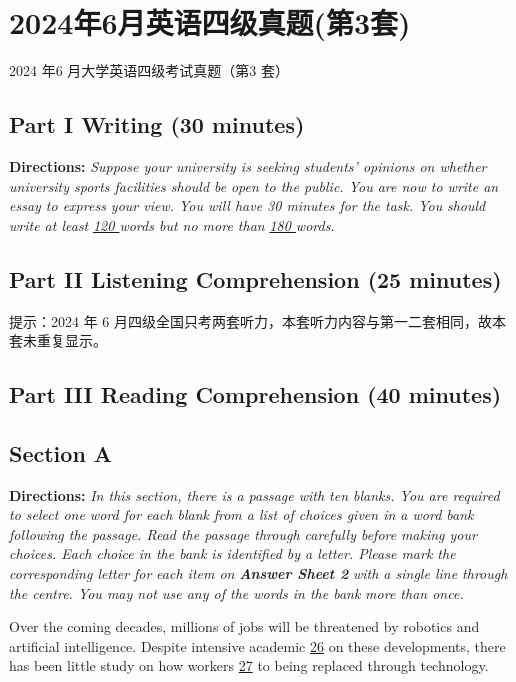 \documentclass[UTF8,11pt]{ctexart}
\begin{document}
\section*{2024年6月英语四级真题(第3套)}
2024 年6 月大学英语四级考试真题（第3 套）


\subsection*{\textbf{Part I Writing} \textbf{(30 minutes)}}


\textbf{Directions:} \textit{Suppose your university is seeking students’ opinions on whether university sports facilities should be} \textit{open to the public. You are now to write an essay to express your view. You will have 30 minutes for the task. You} \textit{should write at least }\textit{\uline{120 }}\textit{words but no more than }\textit{\uline{180 }}\textit{words.}


\subsection*{\textbf{Part II} \textbf{Listening Comprehension} \textbf{(25 minutes)}}


提示：2024 年 6 月四级全国只考两套听力，本套听力内容与第一二套相同，故本套未重复显示。


\subsection*{\textbf{Part III Reading Comprehension (40 minutes)}}


\subsection*{\textbf{Section A}}


\textbf{Directions:} \textit{In this section, there is a passage with ten blanks. You are required to select one word for each blank} \textit{from a list of choices given in a word bank following the passage. Read the passage through carefully before} \textit{making your choices. Each choice in the bank is identified by a letter. Please mark the corresponding letter for} \textit{each item on }\textbf{\textit{Answer Sheet 2}}\textit{ with a single line through the centre. You may not use any of the words in the bank} \textit{more than once.}


Over the coming decades, millions of jobs will be threatened by robotics and artificial intelligence. Despite intensive academic \uline{26} on these developments, there has been little study on how workers \uline{27} to being replaced through technology.
\end{document}
